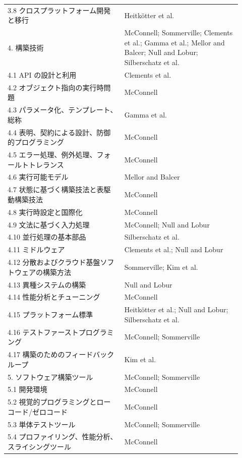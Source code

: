\begin{longtable}{L{0.46\linewidth}L{0.46\linewidth}}
3.8 クロスプラットフォーム開発と移行 & Heitkötter et al. \\
4. 構築技術 & McConnell; Sommerville; Clements et al.; Gamma et al.; Mellor and Balcer; Null and Lobur; Silberschatz et al. \\
4.1 API の設計と利用 & Clements et al. \\
4.2 オブジェクト指向の実行時問題 & McConnell \\
4.3 パラメータ化、テンプレート、総称 & Gamma et al. \\
4.4 表明、契約による設計、防御的プログラミング & McConnell \\
4.5 エラー処理、例外処理、フォールトトレランス & McConnell \\
4.6 実行可能モデル & Mellor and Balcer \\
4.7 状態に基づく構築技法と表駆動構築技法 & McConnell \\
4.8 実行時設定と国際化 & McConnell \\
4.9 文法に基づく入力処理 & McConnell; Null and Lobur \\
4.10 並行処理の基本部品 & Silberschatz et al. \\
4.11 ミドルウェア & Clements et al.; Null and Lobur \\
4.12 分散およびクラウド基盤ソフトウェアの構築方法 & Sommerville; Kim et al. \\
4.13 異種システムの構築 & Null and Lobur \\
4.14 性能分析とチューニング & McConnell \\
4.15 プラットフォーム標準 & Heitkötter et al.; Null and Lobur; Silberschatz et al. \\
4.16 テストファーストプログラミング & McConnell; Sommerville \\
4.17 構築のためのフィードバックループ & Kim et al. \\
5. ソフトウェア構築ツール & McConnell; Sommerville \\
5.1 開発環境 & McConnell \\
5.2 視覚的プログラミングとローコード/ゼロコード & McConnell \\
5.3 単体テストツール & McConnell; Sommerville \\
5.4 プロファイリング、性能分析、スライシングツール & McConnell \\
\bottomrule
\end{longtable}
